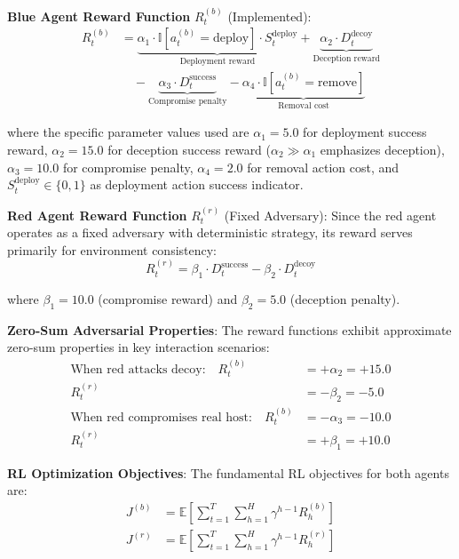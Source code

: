 \documentclass[12pt,oneside]{article}
\begin{document}
\textbf{Blue Agent Reward Function} $R_t^{(b)}$ (Implemented):
\begin{align}
R_t^{(b)} &= \underbrace{\alpha_1 \cdot \mathbb{I}[a_t^{(b)} = \text{deploy}] \cdot S_t^{\text{deploy}}}_{\text{Deployment reward}} + \underbrace{\alpha_2 \cdot D_t^{\text{decoy}}}_{\text{Deception reward}} \nonumber \\
&\quad - \underbrace{\alpha_3 \cdot D_t^{\text{success}}}_{\text{Compromise penalty}} - \underbrace{\alpha_4 \cdot \mathbb{I}[a_t^{(b)} = \text{remove}]}_{\text{Removal cost}}
\end{align}

where the specific parameter values used are $\alpha_1 = 5.0$ for deployment success reward, $\alpha_2 = 15.0$ for deception success reward ($\alpha_2 \gg \alpha_1$ emphasizes deception), $\alpha_3 = 10.0$ for compromise penalty, $\alpha_4 = 2.0$ for removal action cost, and $S_t^{\text{deploy}} \in \{0, 1\}$ as deployment action success indicator.

\textbf{Red Agent Reward Function} $R_t^{(r)}$ (Fixed Adversary):
Since the red agent operates as a fixed adversary with deterministic strategy, its reward serves primarily for environment consistency:
\begin{equation}
R_t^{(r)} = \beta_1 \cdot D_t^{\text{success}} - \beta_2 \cdot D_t^{\text{decoy}}
\end{equation}

where $\beta_1 = 10.0$ (compromise reward) and $\beta_2 = 5.0$ (deception penalty).

\textbf{Zero-Sum Adversarial Properties}:
The reward functions exhibit approximate zero-sum properties in key interaction scenarios:
\begin{align}
\text{When red attacks decoy:} \quad R_t^{(b)} &= +\alpha_2 = +15.0 \\
R_t^{(r)} &= -\beta_2 = -5.0 \\
\text{When red compromises real host:} \quad R_t^{(b)} &= -\alpha_3 = -10.0 \\
R_t^{(r)} &= +\beta_1 = +10.0
\end{align}

\textbf{RL Optimization Objectives}:
The fundamental RL objectives for both agents are:
\begin{align}
J^{(b)} &= \mathbb{E}\left[\sum_{t=1}^{T} \sum_{h=1}^{H} \gamma^{h-1} R_h^{(b)}\right] \\
J^{(r)} &= \mathbb{E}\left[\sum_{t=1}^{T} \sum_{h=1}^{H} \gamma^{h-1} R_h^{(r)}\right]
\end{align}
\end{document}
